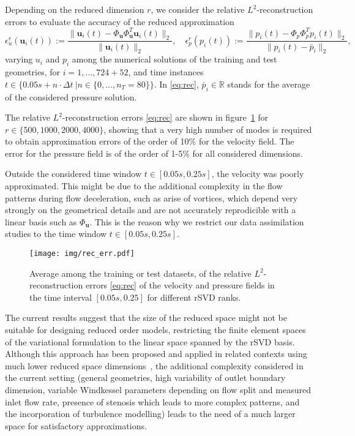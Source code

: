 Depending on the reduced dimension $r$, we consider the relative $L^2$-reconstruction errors to evaluate the accuracy of the reduced approximation 
\begin{equation}
  \label{eq:rec}
  \epsilon^{r}_{u} (\mathbf u_i(t)) := \frac{\lVert \mathbf u_i(t) -\Phi_{\mathbf u}\Phi_{\mathbf u}^T \mathbf u_i(t)\rVert_2}{\lVert \mathbf u_i(t) \rVert_2},\quad 
  \epsilon^{r}_p (p_i(t)) := \frac{\lVert p_i(t)-\Phi_p\Phi_p^T p_i(t)\rVert_2}{\lVert p_i(t)-\bar{p}_i \rVert_2},
\end{equation}
varying $u_i$ and $p_i$ among the numerical solutions of the training and test geometries, for $i=1,\hdots,724 + 52$, and time instances $t\in \{0.05s+n\cdot\Delta t\ | n\in\{0,\dots, n_T=80\}\}$.
In \eqref{eq:rec}, $\bar{p}_i\in\mathbb{R}$ stands for the average of the considered pressure solution.

The relative $L^2$-reconstruction errors \eqref{eq:rec} are shown in figure~\ref{fig:recerr} for $r\in\{500, 1000, 2000, 4000\}$, showing that a very high number of modes
is required to obtain approximation errors of the order of 10\% for the velocity field. The error for the pressure field is of the order of 1-5\% for all considered dimensions.
%
\begin{rmk}
  \label{rmk:timewindow}
  Outside the considered time window $t \in [0.05s,0.25s]$, the velocity was poorly approximated. This might be due to the additional complexity in the flow patterns during flow deceleration, such as arise of vortices, which depend very strongly on the geometrical details and are not accurately reprodicible with a linear basis such as $\Phi_{\mathbf u}$. This is the reason why we restrict our data assimilation studies to the time window $t \in [0.05s,0.25s]$.
\end{rmk}

\begin{figure}[!htp]
  \centering
  \texttt{[image: img/rec\_err.pdf]}
  \caption{Average among the training or test datasets, of the relative $L^2$-reconstruction errors \eqref{eq:rec} of the velocity 
  and pressure fields in the time interval $[0.05s,0.25]$ for different rSVD ranks.}
  \label{fig:recerr}
\end{figure}
The current results suggest that the size of the reduced space might not be suitable for designing reduced order models, restricting the finite element spaces of the variational formulation to the linear space spanned by the rSVD basis.
Although this approach has been proposed and applied in related contexts using much lower reduced space dimensions~\cite{guibert2014group,PEGOLOTTI2021113762}, the additional complexity
considered in the current setting (general geometries, high variability of outlet boundary dimension, variable Windkessel parameters depending on flow split and measured inlet flow rate, presence of 
stenosis which leads to more complex patterns, and the incorporation of turbulence modelling) leads to the need of a much larger space for satisfactory approximations.

